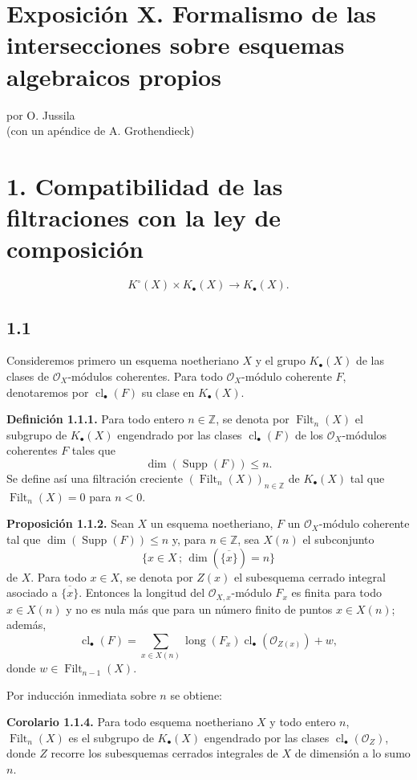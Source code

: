\documentclass[11pt]{article}
\providecommand{\Filt}{\operatorname{Filt}}
\providecommand{\Supp}{\operatorname{Supp}}
\providecommand{\longg}{\operatorname{long}}
\providecommand{\cl}{\operatorname{cl}}
\begin{document}
\section*{Exposición X. Formalismo de las intersecciones sobre esquemas algebraicos propios}
\begin{center}
por O. Jussila\\
(con un apéndice de A. Grothendieck)
\end{center}

\section*{1. Compatibilidad de las filtraciones con la ley de composición}
\[
K^\circ(X)\times K_\bullet(X)\longrightarrow K_\bullet(X).
\]

\subsection*{1.1}
Consideremos primero un esquema noetheriano $X$ y el grupo $K_\bullet(X)$ de
las clases de $\mathcal O_X$-módulos coherentes. Para todo $\mathcal O_X$-módulo
coherente $F$, denotaremos por $\cl_\bullet(F)$ su clase en $K_\bullet(X)$.

\textbf{Definición 1.1.1.}
Para todo entero $n\in\mathbb Z$, se denota por $\Filt_n(X)$ el subgrupo de
$K_\bullet(X)$ engendrado por las clases $\cl_\bullet(F)$ de los
$\mathcal O_X$-módulos coherentes $F$ tales que
\[
\dim(\Supp(F))\leq n.
\]
Se define así una filtración creciente $(\Filt_n(X))_{n\in\mathbb Z}$ de
$K_\bullet(X)$ tal que $\Filt_n(X)=0$ para $n<0$.

\textbf{Proposición 1.1.2.}
Sean $X$ un esquema noetheriano, $F$ un $\mathcal O_X$-módulo coherente tal
que $\dim(\Supp(F))\leq n$ y, para $n\in\mathbb Z$, sea $X(n)$ el
subconjunto
\[
\{x\in X\,;\,\dim(\overline{\{x\}})=n\}
\]
de $X$. Para todo $x\in X$, se denota por $Z(x)$ el subesquema cerrado
integral asociado a $\overline{\{x\}}$. Entonces la longitud del
$\mathcal O_{X,x}$-módulo $F_x$ es finita para todo $x\in X(n)$ y no es nula
más que para un número finito de puntos $x\in X(n)$; además,
\begin{equation}\tag{1.1.3}
\cl_\bullet(F)=
\sum_{x\in X(n)}\longg(F_x)\cl_\bullet(\mathcal O_{Z(x)})+w,
\end{equation}
donde $w\in\Filt_{n-1}(X)$.

Por inducción inmediata sobre $n$ se obtiene:

\textbf{Corolario 1.1.4.}
Para todo esquema noetheriano $X$ y todo entero $n$, $\Filt_n(X)$ es el
subgrupo de $K_\bullet(X)$ engendrado por las clases
$\cl_\bullet(\mathcal O_Z)$, donde $Z$ recorre los subesquemas cerrados
integrales de $X$ de dimensión a lo sumo $n$.
\end{document}
